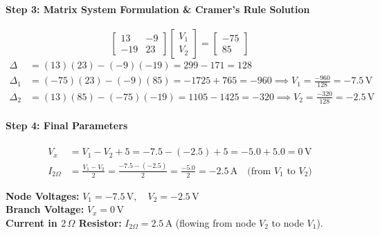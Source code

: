 \documentclass[11pt,a4paper,oneside]{article}
\begin{document}
\paragraph{Step 3: Matrix System Formulation \& Cramer's Rule Solution}
\begin{equation}
\begin{bmatrix}
13 & -9 \\
-19 & 23
\end{bmatrix}
\begin{bmatrix}
V_1 \\ V_2
\end{bmatrix}
=
\begin{bmatrix}
-75 \\ 85
\end{bmatrix}
\end{equation}
\begin{align*}
\Delta &= (13)(23) - (-9)(-19) = 299 - 171 = 128 \\
\Delta_1 &= (-75)(23) - (-9)(85) = -1725 + 765 = -960 \implies V_1 = \frac{-960}{128} = -7.5\,\mathrm{V} \\
\Delta_2 &= (13)(85) - (-75)(-19) = 1105 - 1425 = -320 \implies V_2 = \frac{-320}{128} = -2.5\,\mathrm{V}
\end{align*}

\paragraph{Step 4: Final Parameters}
\begin{align*}
  V_x &= V_1 - V_2 + 5 = -7.5 - (-2.5) + 5 = -5.0 + 5.0 = 0\,\mathrm{V} \\
  I_{2\Omega} &= \frac{V_1 - V_2}{2} = \frac{-7.5 - (-2.5)}{2} = \frac{-5.0}{2} = -2.5\,\mathrm{A} \quad \text{(from $V_1$ to $V_2$)}
\end{align*}

\begin{answerbox}
\textbf{Node Voltages:} $V_1 = -7.5\,\mathrm{V}, \quad V_2 = -2.5\,\mathrm{V}$ \\
\textbf{Branch Voltage:} $V_x = 0\,\mathrm{V}$ \\
\textbf{Current in $2\,\Omega$ Resistor:} $I_{2\Omega} = 2.5\,\mathrm{A}$ (flowing from node $V_2$ to node $V_1$).
\end{answerbox}

\newpage

\end{document}
